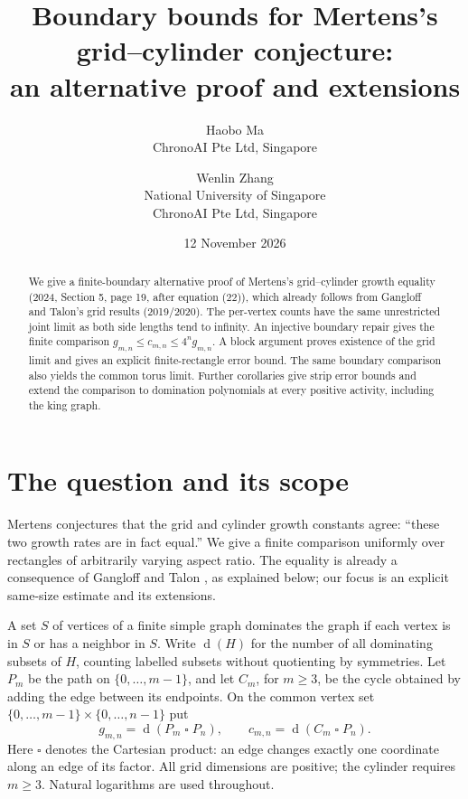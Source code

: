 \documentclass[11pt]{article}
\title{Boundary bounds for Mertens's grid--cylinder conjecture:\\an alternative proof and extensions}
\author{Haobo Ma\\\small ChronoAI Pte Ltd, Singapore
\and Wenlin Zhang\\\small National University of Singapore\\\small ChronoAI Pte Ltd, Singapore}
\date{12 November 2026}
\newcommand{\ds}{\operatorname{d}}
\begin{document}
\maketitle
\begin{abstract}
We give a finite-boundary alternative proof of Mertens's grid--cylinder
growth equality (2024, Section 5, page 19, after equation (22)), which
already follows from Gangloff and Talon's grid results (2019/2020).
The per-vertex counts have the same unrestricted joint limit as both side
lengths tend to infinity. An injective boundary repair gives the finite
comparison $g_{m,n}\le c_{m,n}\le4^n g_{m,n}$.
A block argument proves existence of the grid limit and gives an explicit
finite-rectangle error bound. The same boundary comparison also yields
the common torus limit. Further corollaries give strip error bounds and
extend the comparison to domination polynomials at every positive activity,
including the king graph.
\end{abstract}

\section{The question and its scope}
Mertens \cite[Section 5, p.~19, after (22)]{mertens} conjectures that
the grid and cylinder growth constants agree: ``these two growth rates
are in fact equal.'' We give a finite comparison uniformly over rectangles
of arbitrarily varying aspect ratio. The equality is already a consequence
of Gangloff and Talon \cite[Lemma 4 and Theorem 1]{gangloff}, as explained
below; our focus is an explicit same-size estimate and its extensions.

A set $S$ of vertices of a finite simple graph dominates the graph if
each vertex is in $S$ or has a neighbor in $S$. Write $\ds(H)$ for the
number of all dominating subsets of $H$, counting labelled subsets
without quotienting by symmetries. Let $P_m$ be the path on
$\{0,\ldots,m-1\}$, and let $C_m$, for $m\ge3$, be the cycle obtained
by adding the edge between its endpoints. On the common vertex set
$\{0,\ldots,m-1\}\times\{0,\ldots,n-1\}$ put
\[
 g_{m,n}=\ds(P_m\mathbin\square P_n),\qquad
 c_{m,n}=\ds(C_m\mathbin\square P_n).
\]
Here $\square$ denotes the Cartesian product: an edge changes exactly one
coordinate along an edge of its factor. All grid dimensions are positive;
the cylinder requires $m\ge3$. Natural logarithms are used throughout.
\end{document}
